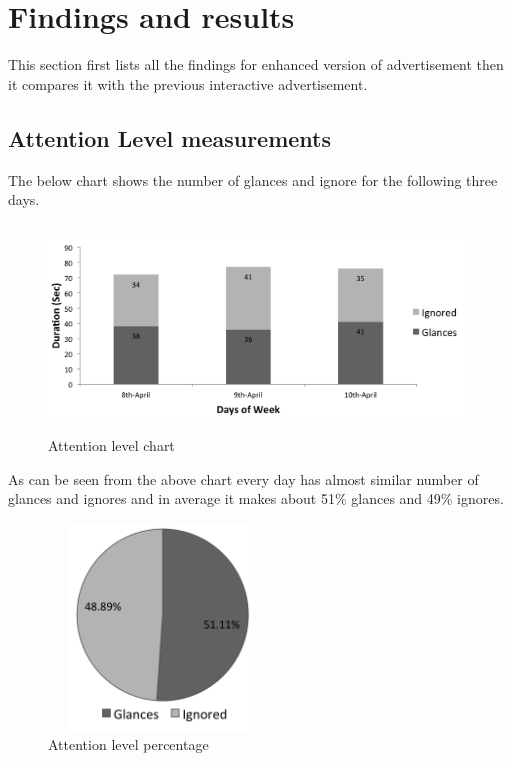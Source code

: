 \begin{enumerate}
\end{enumerate}

\section{Findings and results}
This section first lists all the findings for enhanced version of advertisement then it compares it with the previous interactive advertisement.


\subsection{Attention Level measurements}
The below chart shows the number of glances and ignore for the following three days.

\begin{figure}[H]
    \centering
    \includegraphics[width=110mm,height=55mm]{Figures/9/newbody_Inter_chart}%
    \caption{Attention level chart}%
    \label{fig:newbodyattentionlevelchart}%
\end{figure}


As can be seen from the above chart every day has almost similar number of glances and ignores and in average it makes about 51\% glances and 49\% ignores.


\begin{figure}[H]
    \centering
    \includegraphics[width=60mm,height=55mm]{Figures/9/newbody_inter_percentage}
    \caption{Attention level percentage}%
    \label{fig:Nonattentionlevelpercentage}%
\end{figure}



